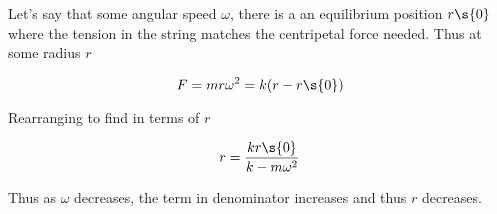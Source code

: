 \begin{problem}
{Let's say that some angular speed $\omega$, there is a an equilibrium position $r\s{0}$ where the tension in the string matches the centripetal force needed. Thus at some radius $r$

\begin{equation*}
F = m r \omega^2 = k(r - r\s{0})
\end{equation*}

Rearranging to find in terms of $r$

\begin{equation*}
r = \dfrac{k r\s{0}}{k-m\omega^2}
\end{equation*}

Thus as $\omega$ decreases, the term in denominator increases and thus $r$ decreases.
}
\end{problem}